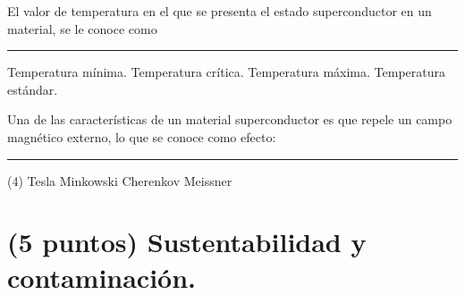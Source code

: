 \documentclass[12pt, letter]{exam}
\begin{document}
\begin{questions}
    \newpage

    \question El valor de temperatura en el que se presenta el estado superconductor en un material, se le conoce como \rule{2cm}{0.1mm}
    \begin{multicols}{2}
    \begin{tasks}
        \task Temperatura mínima.
        \task Temperatura crítica.
        \task Temperatura máxima.
        \task Temperatura estándar.
    \end{tasks}
    \end{multicols}
    \question Una de las características de un material superconductor es que repele un campo magnético externo, lo que se conoce como efecto: \rule{2cm}{0.1mm}
    \begin{tasks}(4)
        \task Tesla
        \task Minkowski
        \task Cherenkov
        \task Meissner
    \end{tasks}

    \section{(5 puntos) Sustentabilidad y contaminación.}


\end{questions}
\end{document}
